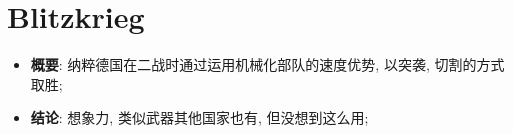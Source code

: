 \section{Blitzkrieg}

  \begin{itemize}
    \item \textbf{概要}: 纳粹德国在二战时通过运用机械化部队的速度优势,
    以突袭, 切割的方式取胜;
    \item \textbf{结论}: 想象力, 类似武器其他国家也有, 但没想到这么用;
  \end{itemize}
